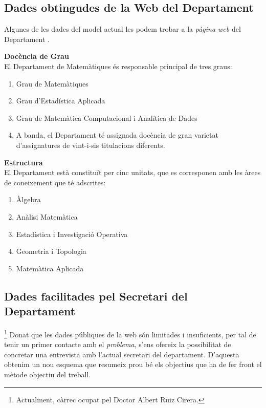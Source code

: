 \documentclass[10pt,twocolumn]{article}
\begin{document}
\subsection{Dades obtingudes de la Web del Departament}
Algunes de les dades del model actual les podem trobar a la \textit{pàgina web} del Departament \cite{webdep}.

\vspace{3mm}

\begin{tcolorbox}[colback=black!1,title=\textbf{Dades públiques a la web},coltitle=black,colbacktitle=black!10]
\textbf{Docència de Grau}\\
El Departament de Matemàtiques és responsable principal de tres graus:
	\begin{enumerate}
		\item Grau de Matemàtiques
		\item Grau d'Estadística Aplicada
		\item Grau de Matemàtica Computacional i Analítica de Dades
		\item A banda, el Departament té assignada docència de gran varietat d'assignatures de vint-i-sis titulacions diferents.
	\end{enumerate}
	\textbf{Estructura}\\
	El Departament està constituït per cinc unitats, que es corresponen amb les àrees de coneixement que té adscrites:
	\begin{enumerate}
		\item Àlgebra
		\item Anàlisi Matemàtica
		\item Estadística i Investigació Operativa
		\item Geometria i Topologia
		\item Matemàtica Aplicada
	\end{enumerate}
\end{tcolorbox}
\subsection{Dades facilitades pel Secretari del Departament}\footnote{Actualment, càrrec ocupat pel Doctor Albert Ruiz Cirera.}
Donat que les dades públiques de la web són limitades i insuficients, per tal de tenir un primer contacte amb el \textit{problema}, s'ens ofereix la possibilitat de concretar una entrevista amb l'actual secretari del departament. D'aquesta obtenim un nou esquema que resumeix prou bé els objectius que ha de fer front el mètode objectiu del treball.
\vspace{3mm}
\end{document}
